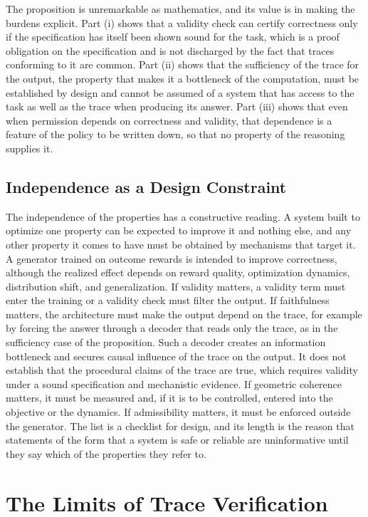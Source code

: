 The proposition is unremarkable as mathematics, and its value is in making the burdens explicit. Part (i) shows that a validity check can certify correctness only if the specification has itself been shown sound for the task, which is a proof obligation on the specification and is not discharged by the fact that traces conforming to it are common. Part (ii) shows that the sufficiency of the trace for the output, the property that makes it a bottleneck of the computation, must be established by design and cannot be assumed of a system that has access to the task as well as the trace when producing its answer. Part (iii) shows that even when permission depends on correctness and validity, that dependence is a feature of the policy to be written down, so that no property of the reasoning supplies it.

\section{Independence as a Design Constraint}

The independence of the properties has a constructive reading. A system built to optimize one property can be expected to improve it and nothing else, and any other property it comes to have must be obtained by mechanisms that target it. A generator trained on outcome rewards is intended to improve correctness, although the realized effect depends on reward quality, optimization dynamics, distribution shift, and generalization. If validity matters, a validity term must enter the training or a validity check must filter the output. If faithfulness matters, the architecture must make the output depend on the trace, for example by forcing the answer through a decoder that reads only the trace, as in the sufficiency case of the proposition. Such a decoder creates an information bottleneck and secures causal influence of the trace on the output. It does not establish that the procedural claims of the trace are true, which requires validity under a sound specification and mechanistic evidence. If geometric coherence matters, it must be measured and, if it is to be controlled, entered into the objective or the dynamics. If admissibility matters, it must be enforced outside the generator. The list is a checklist for design, and its length is the reason that statements of the form that a system is safe or reliable are uninformative until they say which of the properties they refer to.

\chapter{The Limits of Trace Verification}
\label{ch:verification}

